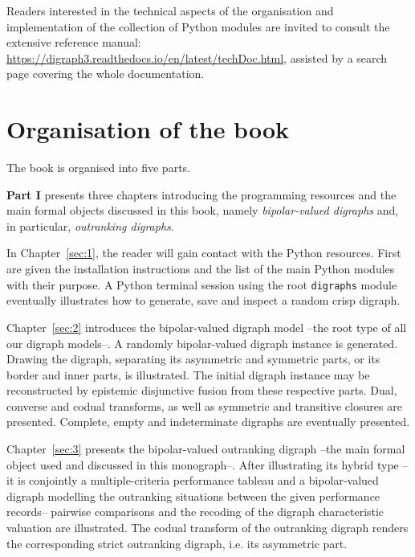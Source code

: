 Readers interested in the technical aspects of the organisation and implementation of the collection of \Digraph Python modules are invited to consult the extensive reference manual: \href{https://digraph3.readthedocs.io/en/latest/techDoc.html}{https://digraph3.readthedocs.io/en/latest/techDoc.html}, assisted by a search page covering the whole \Digraph documentation. 

{}
\section*{Organisation of the book}
\label{sec:0.2}

The book is organised into five parts.
\vspace{5pt}

\textbf{Part I} presents three chapters introducing the \Digraph programming resources and the main formal objects discussed in this book, namely \emph{bipolar-valued digraphs} and, in particular, \emph{outranking digraphs}.

In Chapter~\ref{sec:1}, the reader will gain contact with the \Digraph Python resources. First are given the installation instructions and the list of the main \Digraph Python modules with their purpose. A Python terminal session using the root \texttt{digraphs} module eventually illustrates how to generate, save and inspect a random crisp digraph.

Chapter~\ref{sec:2} introduces the bipolar-valued digraph model --the root type of all our digraph models--. A randomly bipolar-valued digraph instance is generated. Drawing the digraph, separating its asymmetric and symmetric parts, or its border and inner parts, is illustrated. The initial digraph instance may be reconstructed by epistemic disjunctive fusion from these respective parts. Dual, converse and codual transforms, as well as symmetric and transitive closures are presented. Complete, empty and indeterminate digraphs are eventually presented.

Chapter~\ref{sec:3} presents the bipolar-valued outranking digraph --the main formal object used and discussed in this monograph--. After illustrating its hybrid type --it is conjointly a multiple-criteria performance tableau and a bipolar-valued digraph modelling the outranking situations between the given performance records-- pairwise comparisons and the recoding of the digraph characteristic valuation are illustrated. The codual transform of the outranking digraph renders the corresponding strict outranking digraph, i.e. its asymmetric part. 
\vspace{5pt}

